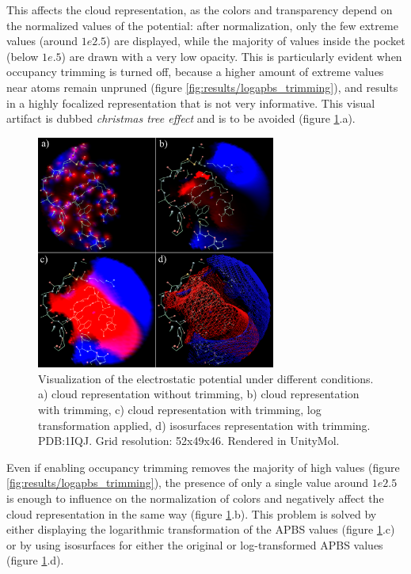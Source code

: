    This affects the cloud representation, as the colors and transparency depend on the normalized values of the potential: after normalization, only the few extreme values (around $1e2.5$) are displayed, while the majority of values inside the pocket (below $1e.5$) are drawn with a very low opacity. This is particularly evident when occupancy trimming is turned off, because a higher amount of extreme values near atoms remain unpruned (figure \ref{fig:results/logapbs_trimming}), and results in a highly focalized representation that is not very informative. This visual artifact is dubbed \textit{christmas tree effect} and is to be avoided (figure \ref{fig:results/apbs_christmas}.a).

    \begin{figure}[H]
      \centering
      \includegraphics[width=0.7\textwidth]{figures/results/apbs_christmas.png}
      \caption{\label{fig:results/apbs_christmas} Visualization of the electrostatic potential under different conditions. a) cloud representation without trimming, b) cloud representation with trimming, c) cloud representation with trimming, log transformation applied, d) isosurfaces representation with trimming. PDB:1IQJ. Grid resolution: 52x49x46. Rendered in UnityMol.}
    \end{figure}

    Even if enabling occupancy trimming removes the majority of high values (figure \ref{fig:results/logapbs_trimming}), the presence of only a single value around $1e2.5$ is enough to influence on the normalization of colors and negatively affect the cloud representation in the same way (figure \ref{fig:results/apbs_christmas}.b). This problem is solved by either displaying the logarithmic transformation of the APBS values (figure \ref{fig:results/apbs_christmas}.c) or by using isosurfaces for either the original or log-transformed APBS values (figure \ref{fig:results/apbs_christmas}.d).


